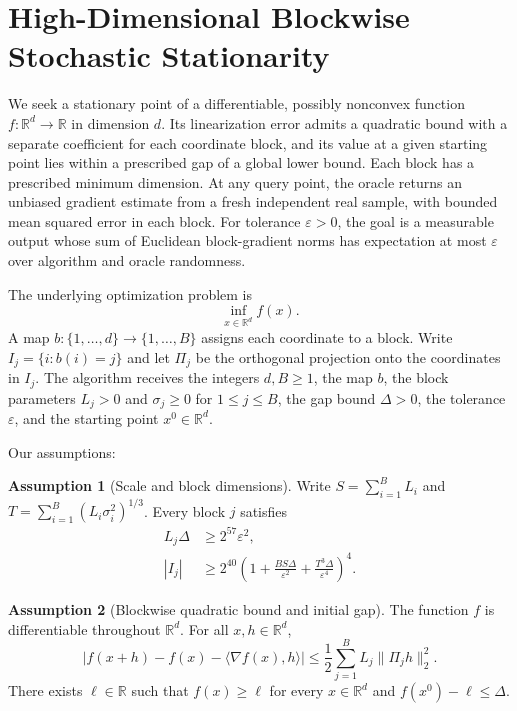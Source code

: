 \documentclass[10pt]{article}
\theoremstyle{definition}
\newtheorem{assumption}{Assumption}
\begin{document}
\section*{High-Dimensional Blockwise Stochastic Stationarity}
We seek a stationary point of a differentiable, possibly nonconvex function $f:\mathbb{R}^d\to\mathbb{R}$ in dimension $d$. Its linearization error admits a quadratic bound with a separate coefficient for each coordinate block, and its value at a given starting point lies within a prescribed gap of a global lower bound. Each block has a prescribed minimum dimension. At any query point, the oracle returns an unbiased gradient estimate from a fresh independent real sample, with bounded mean squared error in each block. For tolerance $\varepsilon>0$, the goal is a measurable output whose sum of Euclidean block-gradient norms has expectation at most $\varepsilon$ over algorithm and oracle randomness.

The underlying optimization problem is
\[
\inf_{x\in\mathbb{R}^d} f(x).
\]
A map $b:\{1,\ldots,d\}\to\{1,\ldots,B\}$ assigns each coordinate to a block. Write $I_j=\{i:b(i)=j\}$ and let $\Pi_j$ be the orthogonal projection onto the coordinates in $I_j$. The algorithm receives the integers $d,B\geq 1$, the map $b$, the block parameters $L_j>0$ and $\sigma_j\geq 0$ for $1\leq j\leq B$, the gap bound $\Delta>0$, the tolerance $\varepsilon$, and the starting point $x^0\in\mathbb{R}^d$.

Our assumptions:
\begin{assumption}[Scale and block dimensions]
Write $S=\sum_{i=1}^B L_i$ and $T=\sum_{i=1}^B (L_i\sigma_i^2)^{1/3}$. Every block $j$ satisfies
\[
\begin{aligned}
L_j\Delta &\geq 2^{57}\varepsilon^2,\\
|I_j| &\geq 2^{40}\left(1+\frac{B S\Delta}{\varepsilon^2}+\frac{T^3\Delta}{\varepsilon^4}\right)^4.
\end{aligned}
\]
\end{assumption}

\begin{assumption}[Blockwise quadratic bound and initial gap]
The function $f$ is differentiable throughout $\mathbb{R}^d$. For all $x,h\in\mathbb{R}^d$,
\[
\left|f(x+h)-f(x)-\langle\nabla f(x),h\rangle\right|
\leq \frac{1}{2}\sum_{j=1}^B L_j\|\Pi_j h\|_2^2.
\]
There exists $\ell\in\mathbb{R}$ such that $f(x)\geq\ell$ for every $x\in\mathbb{R}^d$ and $f(x^0)-\ell\leq\Delta$.
\end{assumption}
\end{document}
